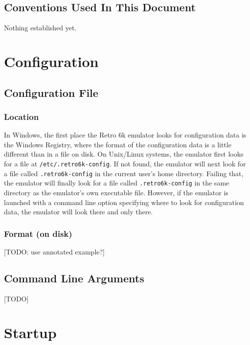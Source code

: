 \documentclass[12pt]{{memoir}}
\begin{document}
\vspace*{3in}
\section*{Conventions Used In This Document}

Nothing established yet.

\chapter{Configuration}

\section{Configuration File}

\subsection{Location}

In Windows, the first place the Retro 6k emulator looks for configuration data is the Windows Registry, where the format of the configuration data is a little different than in a file on disk. On Unix/Linux systems, the emulator first looks for a file at \texttt{/etc/.retro6k-config}. If not found, the emulator will next look for a file called \texttt{.retro6k-config} in the current user's home directory. Failing that, the emulator will finally look for a file called \texttt{.retro6k-config} in the same directory as the emulator's own executable file. However, if the emulator is launched with a command line option specifying where to look for configuration data, the emulator will look there and only there.

\subsection{Format (on disk)}

[TODO: use annotated example?]

\section{Command Line Arguments}

[TODO]

\chapter{Startup}
\end{document}
